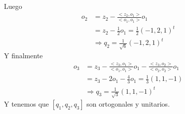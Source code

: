 \documentclass[letter]{memoir} %
\begin{document}
\begin{enumerate}
Luego 
\begin{equation*}
\begin{split}
o_2 &= z_2 - \frac{<z_2,o_1>}{<o_1, o_1>}o_1 \\
 & = z_2 - \frac{1}{2}o_1 = \frac{1}{2}(-1 , 2 ,1)^t \\
 & \Rightarrow q_2 = \frac{1}{\sqrt{6}} (-1,2,1)^t
\end{split}
\end{equation*}
Y finalmente 
\begin{equation*}
\begin{split}
o_3 &= z_3 - \frac{<z_3,o_1>}{<o_1, o_1>}o_1 -\frac{<z_3,o_2>}{<o_2, o_2>}o_1 \\
 &= z_3 - 2o_1 -\frac{4}{3}o_1 = \frac{1}{3}(1,1,-1) \\
 & \Rightarrow q_3 = \frac{1}{\sqrt{3}} (1,1,-1)^t
\end{split}
\end{equation*}
Y tenemos que $[q_1,q_2,q_3]$ son ortogonales y unitarios.


\end{enumerate}
\end{document}
